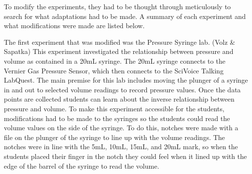 \documentclass[11.5pt]{sig-alternate} %
\begin{document}
\begin{large}
To modify the experiments, they had to be thought through meticulously to search for what adaptations had to be made. A summary of each experiment and what modifications were made are listed below. 

The first experiment that was modified was the Pressure Syringe lab. (Volz \& Sapatka) This experiment investigated the relationship between pressure and volume as contained in a 20mL syringe. The 20mL syringe connects to the Vernier Gas Pressure Sensor, which then connects to the SciVoice Talking LabQuest. The main premise for this lab includes moving the plunger of a syringe in and out to selected volume readings to record pressure values. Once the data points are collected students can learn about the inverse relationship between pressure and volume. To make this experiment accessible for the students, modifications had to be made to the syringes so the students could read the volume values on the side of the syringe. To do this, notches were made with a file on the plunger of the syringe to line up with the volume readings. The notches were in line with the 5mL, 10mL, 15mL, and 20mL mark, so when the students placed their finger in the notch they could feel when it lined up with the edge of the barrel of the syringe to read the volume. 


\end{large}
\end{document}
